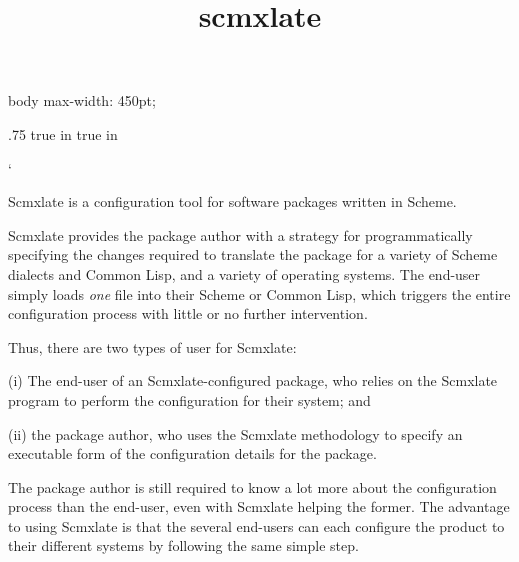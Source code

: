 
%

%


\ifx\shipout\UnDeFiNeD
\cssblock
body { max-width: 450pt; }
\endcssblock
\fi

\let\TZPtexlayout 0
\let\n\noindent
\let\f\numberedfootnote
\let\q\scm

\ifx\shipout\toHTML
\let\oldsection\section
\def\section{\eject\oldsection}
\fi
\let\re\subsection

\advance\hoffset .75 true in
\advance{} true in

\activettchar`

\title{scmxlate}


\centerline{}

\centerline{}

\medskip

Scmxlate is a configuration tool for software
packages written in Scheme.

Scmxlate provides the package author with a strategy
for programmatically specifying the changes required to
translate the package for a variety of Scheme dialects
and Common Lisp, and a variety of operating systems.
The end-user simply loads {\em one} file into
their Scheme or Common Lisp, which triggers the entire
configuration process with little or no further
intervention.

Thus, there are two types of user for Scmxlate:

(i) The end-user of an Scmxlate-configured package, who
relies on the
Scmxlate program to perform the configuration
for their system; and

(ii) the package author, who uses the Scmxlate
methodology to specify an executable form of the
configuration details for the package.

\n The package author is still required to know a lot more
about the configuration process than the end-user, even
with Scmxlate helping the former.
The advantage to using Scmxlate is that the several
end-users can each configure the product to their
different systems by following the same simple
step.

